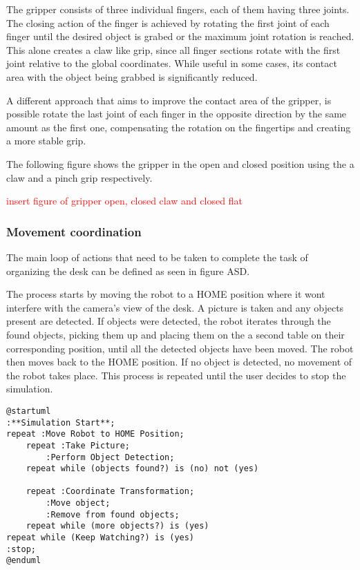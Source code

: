 The gripper consists of three individual fingers, each of them having three joints. The closing action of the finger is achieved by rotating the first joint of each finger until the desired object is grabed or the maximum joint rotation is reached. This alone creates a claw like grip, since all finger sections rotate with the first joint relative to the global coordinates. While useful in some cases, its contact area with the object being grabbed is significantly reduced.

A different approach that aims to improve the contact area of the gripper, is possible rotate the last joint of each finger in the opposite direction by the same amount as the first one, compensating the rotation on the fingertips and creating a more stable grip.

The following figure shows the gripper in the open and closed position using the a claw and a pinch grip respectively.

\textcolor{red}{insert figure of gripper open, closed claw and closed flat} %


\subsubsection{Movement coordination}

The main loop of actions that need to be taken to complete the task of organizing the desk can be defined as seen in figure ASD. 

The process starts by moving the robot to a HOME position where it wont interfere with the camera's view of the desk. A picture is taken and any objects present are detected. If objects were detected, the robot iterates through the found objects, picking them up and placing them on the a second table on their corresponding position, until all the detected objects have been moved. The robot then moves back to the HOME position. If no object is detected, no movement of the robot takes place. This process is repeated until the user decides to stop the simulation.

\begin{lstlisting}[]%language=plantuml
@startuml
:**Simulation Start**;
repeat :Move Robot to HOME Position;
    repeat :Take Picture;
        :Perform Object Detection;
    repeat while (objects found?) is (no) not (yes)

    repeat :Coordinate Transformation;
        :Move object;
        :Remove from found objects;
    repeat while (more objects?) is (yes)
repeat while (Keep Watching?) is (yes)
:stop;
@enduml
\end{lstlisting}

